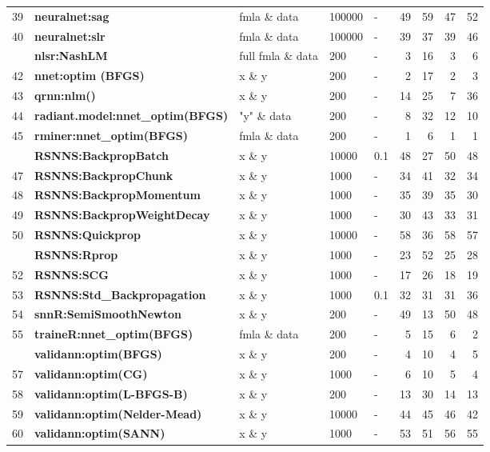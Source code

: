 \begin{Schunk}
\begin{table}
\begin{tabular}[t]{r>{}llllrrrr}
39 & \textbf{neuralnet:sag} & fmla \& data & 100000 & - & 49 & 59 & 47 & 52\\
40 & \textbf{neuralnet:slr} & fmla \& data & 100000 & - & 39 & 37 & 39 & 46\\
\addlinespace
41 & \textbf{nlsr:NashLM} & full fmla \& data & 200 & - & 3 & 16 & 3 & 6\\
42 & \textbf{nnet:optim (BFGS)} & x \& y & 200 & - & 2 & 17 & 2 & 3\\
43 & \textbf{qrnn:nlm()} & x \& y & 200 & - & 14 & 25 & 7 & 36\\
44 & \textbf{radiant.model:nnet\_optim(BFGS)} & "y" \& data & 200 & - & 8 & 32 & 12 & 10\\
45 & \textbf{rminer:nnet\_optim(BFGS)} & fmla \& data & 200 & - & 1 & 6 & 1 & 1\\
\addlinespace
46 & \textbf{RSNNS:BackpropBatch} & x \& y & 10000 & 0.1 & 48 & 27 & 50 & 48\\
47 & \textbf{RSNNS:BackpropChunk} & x \& y & 1000 & - & 34 & 41 & 32 & 34\\
48 & \textbf{RSNNS:BackpropMomentum} & x \& y & 1000 & - & 35 & 39 & 35 & 30\\
49 & \textbf{RSNNS:BackpropWeightDecay} & x \& y & 1000 & - & 30 & 43 & 33 & 31\\
50 & \textbf{RSNNS:Quickprop} & x \& y & 10000 & - & 58 & 36 & 58 & 57\\
\addlinespace
51 & \textbf{RSNNS:Rprop} & x \& y & 1000 & - & 23 & 52 & 25 & 28\\
52 & \textbf{RSNNS:SCG} & x \& y & 1000 & - & 17 & 26 & 18 & 19\\
53 & \textbf{RSNNS:Std\_Backpropagation} & x \& y & 1000 & 0.1 & 32 & 31 & 31 & 36\\
54 & \textbf{snnR:SemiSmoothNewton} & x \& y & 200 & - & 49 & 13 & 50 & 48\\
55 & \textbf{traineR:nnet\_optim(BFGS)} & fmla \& data & 200 & - & 5 & 15 & 6 & 2\\
\addlinespace
56 & \textbf{validann:optim(BFGS)} & x \& y & 200 & - & 4 & 10 & 4 & 5\\
57 & \textbf{validann:optim(CG)} & x \& y & 1000 & - & 6 & 10 & 5 & 4\\
58 & \textbf{validann:optim(L-BFGS-B)} & x \& y & 200 & - & 13 & 30 & 14 & 13\\
59 & \textbf{validann:optim(Nelder-Mead)} & x \& y & 10000 & - & 44 & 45 & 46 & 42\\
60 & \textbf{validann:optim(SANN)} & x \& y & 1000 & - & 53 & 51 & 56 & 55\\
\bottomrule
\end{tabular}
\end{table}

\end{Schunk}

